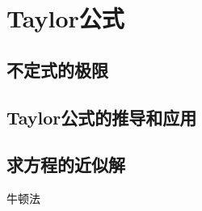 
\section{Taylor公式}
\subsection{不定式的极限}
\clearpage
\subsection{Taylor公式的推导和应用}
\clearpage

\subsection{求方程的近似解}
\clearpage
牛顿法

